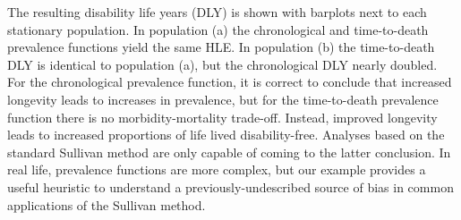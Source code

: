 \documentclass[11pt,oneside,a4paper]{article} %
\begin{document}
The resulting disability life years (DLY) is shown with
barplots next to each stationary population.
In population (a) the chronological and time-to-death prevalence functions yield
the same HLE. In population (b) the time-to-death DLY is identical to population
(a), but the chronological DLY nearly doubled. For the chronological prevalence
function, it is correct to conclude that increased longevity leads to
increases in prevalence, but for the time-to-death prevalence function there is
no morbidity-mortality trade-off. Instead, improved longevity leads to increased
proportions of life lived disability-free. Analyses based on the standard Sullivan method are only
capable of coming to the latter conclusion. In real life, prevalence functions
are more complex, but our example provides a useful heuristic to understand a
previously-undescribed source of bias in common applications of the Sullivan
method.
\end{document}
